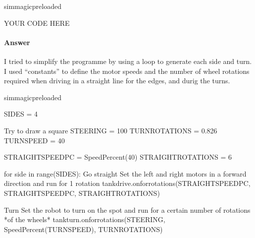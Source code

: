 \documentclass[letterpaper,10pt,english]{sphinxmanual}
\begin{document}

{
\begin{sphinxVerbatim}[commandchars=\\\{\}]
\llap{\color{nbsphinxin}[ ]:\,\hspace{\fboxrule}\hspace{\fboxsep}}\PYGZpc{}\PYGZpc{}sim\PYGZus{}magic\PYGZus{}preloaded

\PYGZsh{} YOUR CODE HERE
\end{sphinxVerbatim}
}


\paragraph{Answer}
\label{\detokenize{content/01_Robot_Lab/Section_00_02:id1}}

I tried to simplify the programme by using a  loop to generate each side and turn. I used “constants” to define the motor speeds and the number of wheel rotations required when driving in a straight line for the edges, and durig the turns.

{
\begin{sphinxVerbatim}[commandchars=\\\{\}]
\llap{\color{nbsphinxin}[ ]:\,\hspace{\fboxrule}\hspace{\fboxsep}}\PYGZpc{}\PYGZpc{}sim\PYGZus{}magic\PYGZus{}preloaded

SIDES = 4

\PYGZsh{} Try to draw a square
STEERING = \PYGZhy{}100
TURN\PYGZus{}ROTATIONS = 0.826
TURN\PYGZus{}SPEED = 40

STRAIGHT\PYGZus{}SPEED\PYGZus{}PC = SpeedPercent(40)
STRAIGHT\PYGZus{}ROTATIONS = 6

for side in range(SIDES):
    \PYGZsh{}Go straight
    \PYGZsh{} Set the left and right motors in a forward direction
    \PYGZsh{} and run for 1 rotation
    tank\PYGZus{}drive.on\PYGZus{}for\PYGZus{}rotations(STRAIGHT\PYGZus{}SPEED\PYGZus{}PC, STRAIGHT\PYGZus{}SPEED\PYGZus{}PC, STRAIGHT\PYGZus{}ROTATIONS)

    \PYGZsh{}Turn
    \PYGZsh{} Set the robot to turn on the spot
    \PYGZsh{} and run for a certain number of rotations *of the wheels*
    tank\PYGZus{}turn.on\PYGZus{}for\PYGZus{}rotations(STEERING, SpeedPercent(TURN\PYGZus{}SPEED), TURN\PYGZus{}ROTATIONS)

\end{sphinxVerbatim}
}
\end{document}
